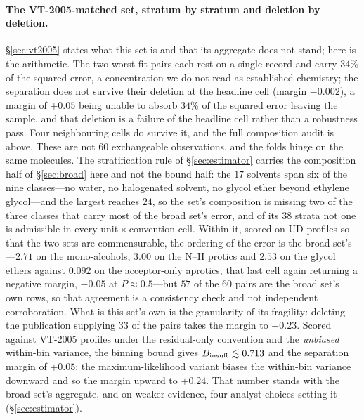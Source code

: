 \paragraph{The VT-2005-matched set, stratum by stratum and deletion by deletion.} \S\ref{sec:vt2005}
states what this set is and that its aggregate does not stand; here is the arithmetic. The two
worst-fit pairs each rest on a single record and carry $34\%$ of the squared error, a concentration
we do not read as established chemistry; the separation does not survive their deletion at the
headline cell (margin $-0.002$), a margin of $+0.05$ being unable to absorb $34\%$ of the squared
error leaving the sample, and that deletion is a failure of the headline cell rather than a
robustness pass. Four neighbouring cells do survive it, and the full composition audit is above.
These are not $60$ exchangeable observations, and the folds hinge on the same molecules. The
stratification rule of \S\ref{sec:estimator} carries the composition half of \S\ref{sec:broad} here
and not the bound half: the $17$ solvents span six of the nine classes---no water, no halogenated
solvent, no glycol ether beyond ethylene glycol---and the largest reaches $24$, so the set's
composition is missing two of the three classes that carry most of the broad set's error, and of
its $38$ strata not one is admissible in every unit\,$\times$\,convention cell. Within it, scored
on UD profiles so that the two sets are commensurable, the ordering of the error is the broad
set's---$2.71$ on the mono-alcohols, $3.00$ on the N--H protics and $2.53$ on the glycol ethers
against $0.092$ on the acceptor-only aprotics, that last cell again returning a negative margin,
$-0.05$ at $P\approx0.5$---but $57$ of the $60$ pairs are the broad set's own rows, so that
agreement is a consistency check and not independent corroboration. What is this set's own is the
granularity of its fragility: deleting the publication supplying $33$ of the pairs takes the margin
to $-0.23$. Scored against VT-2005 profiles under the residual-only convention and the
\emph{unbiased} within-bin variance, the binning bound gives $B_{\mathrm{insuff}}\lesssim0.713$ and the separation
margin of $+0.05$; the maximum-likelihood variant biases the within-bin variance downward and so
the margin upward to $+0.24$. That number stands with the broad set's aggregate, and on weaker
evidence, four analyst choices setting it (\S\ref{sec:estimator}).

